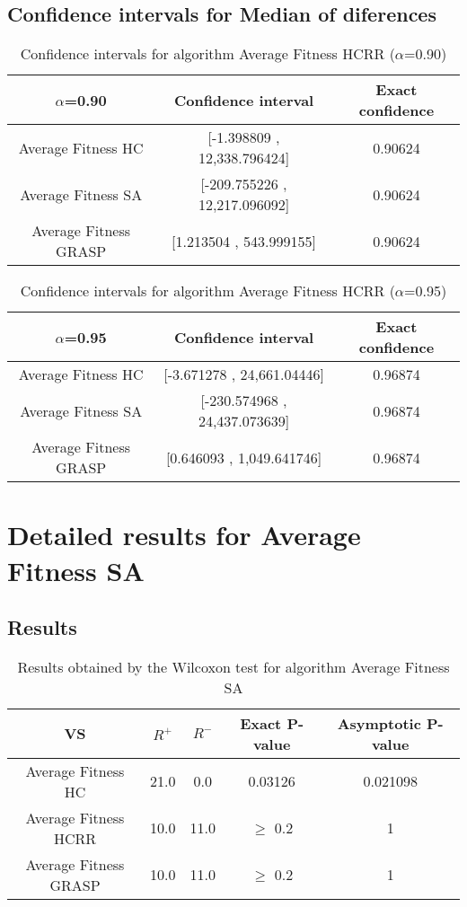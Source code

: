 \documentclass[a4paper,10pt]{article}
\begin{document}
\subsection{Confidence intervals for Median of diferences}

\begin{table}[!htp]
\centering\small
\begin{tabular}{
|c|c|c|}
\hline
 $\alpha$=0.90 & Confidence interval & Exact confidence \\ \hline 
Average Fitness HC     & [-1.398809 , 12,338.796424] & 0.90624\\ \hline 
Average Fitness SA   & [-209.755226 , 12,217.096092] & 0.90624\\ \hline 
Average Fitness GRASP & [1.213504 , 543.999155] & 0.90624\\ \hline 

\end{tabular}
\caption{Confidence intervals for algorithm Average Fitness HCRR    ($\alpha$=0.90)}
\end{table}
\begin{table}[!htp]
\centering\small
\begin{tabular}{
|c|c|c|}
\hline
 $\alpha$=0.95 & Confidence interval & Exact confidence \\ \hline 
Average Fitness HC     & [-3.671278 , 24,661.04446] & 0.96874\\ \hline 
Average Fitness SA   & [-230.574968 , 24,437.073639] & 0.96874\\ \hline 
Average Fitness GRASP & [0.646093 , 1,049.641746] & 0.96874\\ \hline 

\end{tabular}
\caption{Confidence intervals for algorithm Average Fitness HCRR    ($\alpha$=0.95)}
\end{table}

 \clearpage 


\section{Detailed results for Average Fitness SA  }


\subsection{Results}

\begin{table}[!htp]
\centering\small
\begin{tabular}{
|c|c|c|c|c|}
\hline
 VS & $R^{+}$ & $R^{-}$ & Exact P-value & Asymptotic P-value \\ \hline 
Average Fitness HC     & 21.0 & 0.0 & 0.03126 & 0.021098\\ \hline 
Average Fitness HCRR    & 10.0 & 11.0 & $\geq$ 0.2 & 1\\ \hline 
Average Fitness GRASP & 10.0 & 11.0 & $\geq$ 0.2 & 1\\ \hline 

\end{tabular}
\caption{Results obtained by the Wilcoxon test for algorithm Average Fitness SA  }
\end{table}
\end{document}

